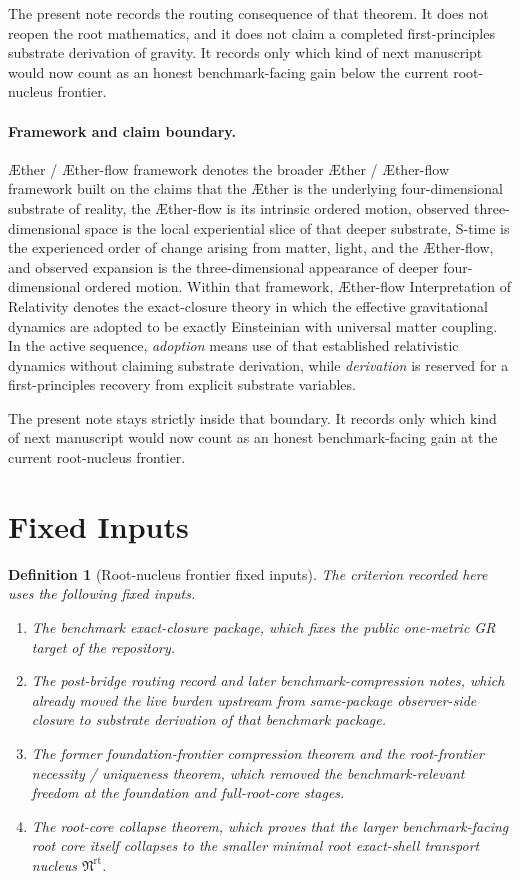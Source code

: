 \documentclass[11pt]{article}
\newcommand{\Aether}{\AE{}ther}
\newcommand{\Aflow}{\AE{}ther-flow}
\newcommand{\TheoryName}{\Aflow{} Interpretation of Relativity}
\newcommand{\TheoryProgram}{\Aether{} / \Aflow{} framework}
\newcommand{\RootNucleus}{\mathfrak N^{\mathrm{rt}}}
\newtheorem{definition}{Definition}
\begin{document}
The present note records the routing consequence of that theorem. It does not reopen the root mathematics, and it does not claim a completed first-principles substrate derivation of gravity. It records only which kind of next manuscript would now count as an honest benchmark-facing gain below the current root-nucleus frontier.

\paragraph{Framework and claim boundary.}
\TheoryProgram{} denotes the broader \Aether{} / \Aflow{} framework built on the claims that the \Aether{} is the underlying four-dimensional substrate of reality, the \Aflow{} is its intrinsic ordered motion, observed three-dimensional space is the local experiential slice of that deeper substrate, S-time is the experienced order of change arising from matter, light, and the \Aflow{}, and observed expansion is the three-dimensional appearance of deeper four-dimensional ordered motion. Within that framework, \TheoryName{} denotes the exact-closure theory in which the effective gravitational dynamics are adopted to be exactly Einsteinian with universal matter coupling. In the active sequence, \emph{adoption} means use of that established relativistic dynamics without claiming substrate derivation, while \emph{derivation} is reserved for a first-principles recovery from explicit substrate variables.

The present note stays strictly inside that boundary. It records only which kind of next manuscript would now count as an honest benchmark-facing gain at the current root-nucleus frontier.

\section{Fixed Inputs}

\begin{definition}[Root-nucleus frontier fixed inputs]
The criterion recorded here uses the following fixed inputs.
\begin{enumerate}
    \item The benchmark exact-closure package, which fixes the public one-metric GR target of the repository.
    \item The post-bridge routing record and later benchmark-compression notes, which already moved the live burden upstream from same-package observer-side closure to substrate derivation of that benchmark package.
    \item The former foundation-frontier compression theorem and the root-frontier necessity / uniqueness theorem, which removed the benchmark-relevant freedom at the foundation and full-root-core stages.
    \item The root-core collapse theorem, which proves that the larger benchmark-facing root core itself collapses to the smaller minimal root exact-shell transport nucleus \(\RootNucleus\).
\end{enumerate}
\end{definition}
\end{document}
